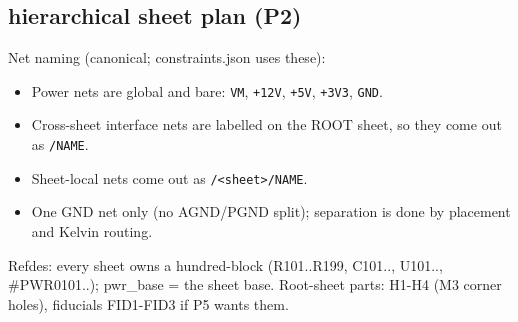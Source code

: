 \documentclass[11pt,a4paper]{article}
\begin{document}
\subsection*{hierarchical sheet plan (P2)}
Net naming (canonical; constraints.json uses these):

\begin{itemize}
\item Power nets are global and bare: \texttt{VM}, \texttt{+12V}, \texttt{+5V}, \texttt{+3V3}, \texttt{GND}.
\item Cross-sheet interface nets are labelled on the ROOT sheet, so they come out as \texttt{/NAME}.
\item Sheet-local nets come out as \texttt{/\textless{}sheet\textgreater{}/NAME}.
\item One GND net only (no AGND/PGND split); separation is done by placement and Kelvin routing.
\end{itemize}
Refdes: every sheet owns a hundred-block (R101..R199, C101.., U101.., \#PWR0101..); pwr\_base = the sheet base. Root-sheet parts: H1-H4 (M3 corner holes), fiducials FID1-FID3 if P5 wants them.
\end{document}
